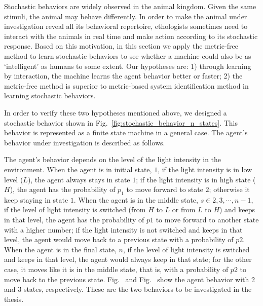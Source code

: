 Stochastic behaviors are widely observed in the animal kingdom. Given the same stimuli, the animal may behave differently. In order to make the animal under investigation reveal all its behavioral repertoire, ethologists sometimes need to interact with the animals in real time and make action according to its stochastic response. Based on this motivation, in this section we apply the metric-free method to learn stochastic behaviors to see whether a machine could also be as `intelligent' as humans to some extent. Our hypotheses are: 1) through learning by interaction, the machine learns the agent behavior better or faster; 2) the metric-free method is superior to metric-based system identification method in learning stochastic behaviors. 

In order to verify these two hypotheses mentioned above, we designed a stochastic behavior shown in Fig.~\ref{fig:stochastic_behavior_n_states}. This behavior is represented as a finite state machine in a general case. The agent's behavior under investigation is described as follows. 

The agent's behavior depends on the level of the light intensity in the environment. When the agent is in initial state, $1$, if the light intensity is in low level ($L$), the agent always stays in state $1$; if the light intensity is in high state ($H$), the agent has the probability of $p_1$ to move forward to state $2$; otherwise it keep staying in state $1$. When the agent is in the middle state, $s \in {2, 3, \cdots, n-1}$, if the level of light intensity is switched (from $H$ to $L$ or from $L$ to $H$) and keeps in that level, the agent has the probability of $p1$ to move forward to another state with a higher number; if the light intensity is not switched and keeps in that level, the agent would move back to a previous state with a probability of $p2$. When the agent is in the final state, $n$, if the level of light intensity is switched and keeps in that level, the agent would always keep in that state; for the other case, it moves like it is in the middle state, that is, with a probability of $p2$ to move back to the previous state. Fig.~ and Fig.~ show the agent behavior with 2 and 3 states, respectively. These are the two behaviors to be investigated in the thesis. 

